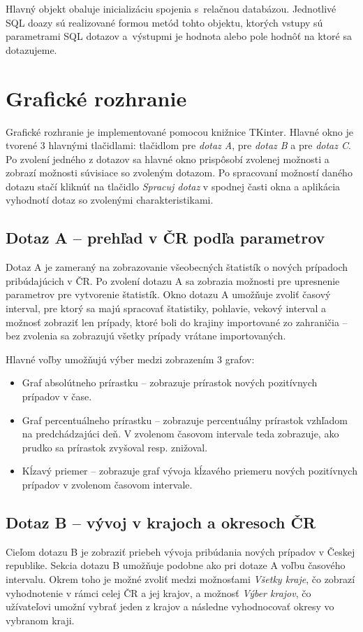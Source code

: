 \documentclass [11pt, a4paper]{article}
\begin{document}
Hlavný objekt obaluje inicializáciu spojenia s~relačnou databázou. Jednotlivé SQL doazy sú realizované formou metód tohto objektu, ktorých vstupy sú parametrami SQL dotazov a~výstupmi je hodnota alebo pole hodnôť na ktoré sa dotazujeme.

\section*{Grafické rozhranie}
Grafické rozhranie je implementované pomocou knižnice TKinter. Hlavné okno je tvorené 3 hlavnými tlačidlami: tlačidlom pre \textit{dotaz A}, pre \textit{dotaz B} a pre \textit{dotaz C}. Po zvolení jedného z dotazov sa hlavné okno prispôsobí zvolenej možnosti a zobrazí možnosti súvisiace so zvoleným dotazom. Po spracovaní možností daného dotazu stačí kliknúť na tlačidlo \textit{Spracuj dotaz} v spodnej časti okna a aplikácia vyhodnotí dotaz so zvolenými charakteristikami.

\subsection*{Dotaz A -- prehľad v ČR podľa parametrov}
Dotaz A je zameraný na zobrazovanie všeobecných štatistík o nových prípadoch pribúdajúcich v ČR.
Po zvolení dotazu A sa zobrazia možnosti pre upresnenie parametrov pre vytvorenie štatistík. 
Okno dotazu A umožňuje zvoliť časový interval, pre ktorý sa majú spracovať štatistiky, pohlavie, vekový interval a možnosť zobraziť len prípady, ktoré boli do krajiny importované zo zahraničia -- bez zvolenia sa zobrazujú všetky prípady vrátane importovaných.

Hlavné voľby umožňujú výber medzi zobrazením 3 grafov:
\begin{itemize}
    \item Graf absolútneho prírastku -- zobrazuje prírastok nových pozitívnych prípadov v čase.
    \item Graf percentuálneho prírastku -- zobrazuje percentuálny prírastok vzhľadom na predchádzajúci deň. V zvolenom časovom intervale teda zobrazuje, ako prudko sa prírastok zvyšoval resp. znižoval.
    \item Kĺzavý priemer -- zobrazuje graf vývoja kĺzavého priemeru nových pozitívnych prípadov v zvolenom časovom intervale.
\end{itemize}

\subsection*{Dotaz B -- vývoj v krajoch a okresoch ČR}
Cieľom dotazu B je zobraziť priebeh vývoja pribúdania nových prípadov v Českej republike.
Sekcia dotazu B umožňuje podobne ako pri dotaze A voľbu časového intervalu. Okrem toho je možné zvoliť medzi možnosťami \textit{Všetky kraje}, čo zobrazí vyhodnotenie v rámci celej ČR a jej krajov, a možnosť \textit{Výber krajov}, čo užívateľovi umožní vybrať jeden z krajov a následne vyhodnocovať okresy vo vybranom kraji.
\end{document}
